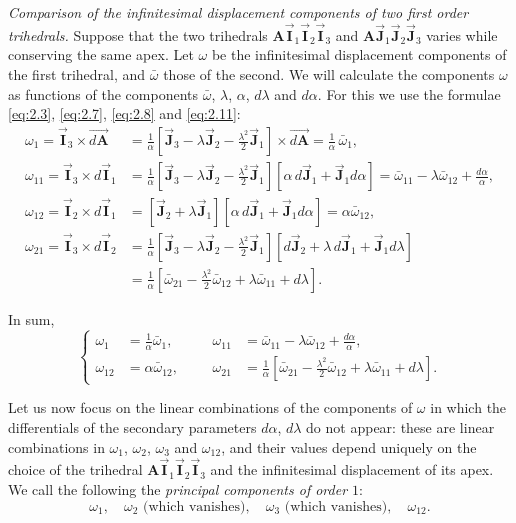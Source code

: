 \documentclass[leqno,11pt]{book}
\numberwithin{equation}{chapter}
\theoremstyle{shape1}
\theoremstyle{shapesmall}
\newcommand{\rvec}[1]{\vec{\mathbf{#1}}}
\newcommand{\ivec}{\rvec{I}}
\newcommand{\jvec}{\rvec{J}}
\newcommand{\somespace}{\vspace{9pt}}
\begin{document}
\emph{Comparison of the infinitesimal displacement components of two first order trihedrals.} Suppose that the two trihedrals $\mathbf{A}\ivec_{1}\ivec_{2}\ivec_{3}$ and $\mathbf{A}\jvec_{1}\jvec_{2}\jvec_{3}$ varies while conserving the same apex. Let $\omega$ be the infinitesimal displacement components of the first trihedral, and $\bar\omega$ those of the second. We will calculate the components $\omega$ as functions of the components $\bar\omega$, $\lambda$, $\alpha$, $d\lambda$ and $d\alpha$. For this we use the formulae \eqref{eq:2.3}, \eqref{eq:2.7}, \eqref{eq:2.8} and \eqref{eq:2.11}:
\begin{align*}
  \omega_{1}=\ivec_{3}\times\overrightarrow{d\mathbf{A}}&=\frac{1}{\alpha}\left[\jvec_{3}-\lambda\jvec_{2}-\frac{\lambda^{2}}{2}\jvec_{1}\right]\times\overrightarrow{d\mathbf{A}}=\frac{1}{\alpha}\,\bar\omega_{1},\\
  \omega_{11}=\ivec_{3}\times{d\ivec_{1}}&=\frac{1}{\alpha}\left[\jvec_{3}-\lambda\jvec_{2}-\frac{\lambda^{2}}{2}\jvec_{1}\right][\alpha\,{d\jvec_{1}}+\jvec_{1}d\alpha]=\bar\omega_{11}-\lambda\bar\omega_{12}+\frac{d\alpha}{\alpha},\\
  \omega_{12}=\ivec_{2}\times{d\ivec_{1}}&=[\jvec_{2}+\lambda\jvec_{1}][\alpha\,d\jvec_{1}+\jvec_{1}d\alpha]=\alpha\bar\omega_{12},\\
  \omega_{21}=\ivec_{3}\times{d\ivec_{2}}&=\frac{1}{\alpha}\left[\jvec_{3}-\lambda\jvec_{2}-\frac{\lambda^{2}}{2}\jvec_{1}\right][d\jvec_{2}+\lambda\,d\jvec_{1}+\jvec_{1}d\lambda]\\
  &=\frac{1}{\alpha}\left[\bar\omega_{21}-\frac{\lambda^{2}}{2}\bar\omega_{12}+\lambda\bar\omega_{11}+d\lambda\right].
\end{align*}

In sum,
\begin{equation}
  \label{eq:2.12}
  \left\{
    \begin{aligned}
      \omega_{1}&=\frac{1}{\alpha}\bar\omega_{1},&&&\omega_{11}&=\bar\omega_{11}-\lambda\bar\omega_{12}+\frac{d\alpha}{\alpha},\\
      \omega_{12}&=\alpha\bar\omega_{12},&&&\omega_{21}&=\frac{1}{\alpha}\left[\bar\omega_{21}-\frac{\lambda^{2}}{2}\bar\omega_{12}+\lambda\bar\omega_{11}+d\lambda\right].
    \end{aligned}
  \right.
\end{equation}

Let us now focus on the linear combinations of the components of $\omega$ in which the differentials of the secondary parameters $d\alpha$, $d\lambda$ do not appear: these are linear combinations in $\omega_{1}$, $\omega_{2}$, $\omega_{3}$ and $\omega_{12}$, and their values depend uniquely on the choice of the trihedral $\mathbf{A}\ivec_{1}\ivec_{2}\ivec_{3}$ and the infinitesimal displacement of its apex. We call the following the \emph{principal components of order $1$}:
\[
\boxed{
\omega_{1},\quad\omega_{2}\text{ (which vanishes)},\quad\omega_{3}\text{ (which vanishes)},\quad\omega_{12}.
}
\]
\somespace
\end{document}
